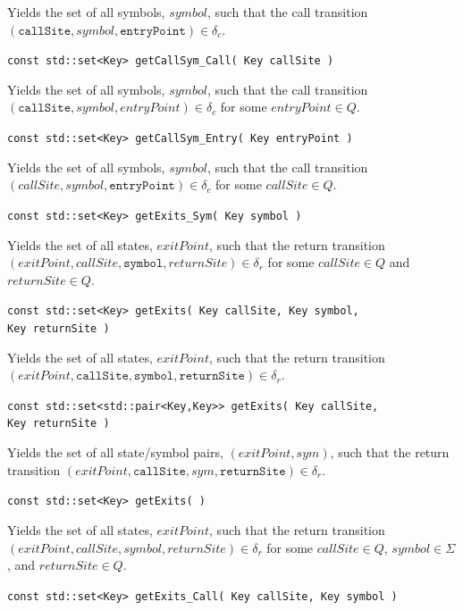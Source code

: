 \documentclass{llncs}
\begin{document}
\begin{description}
    Yields the set of all symbols, $symbol$, such that the call transition $(\texttt{callSite},symbol,\texttt{entryPoint}) \in \delta_c$.

  \item\texttt{const std::set<Key> getCallSym\_Call( Key callSite )}

    Yields the set of all symbols, $symbol$, such that the call transition $(\texttt{callSite},symbol,entryPoint) \in \delta_c$ for some $entryPoint \in Q$.

  \item\texttt{const std::set<Key> getCallSym\_Entry( Key entryPoint )}

    Yields the set of all symbols, $symbol$, such that the call transition $(callSite,symbol,\texttt{entryPoint}) \in \delta_c$ for some $callSite \in Q$.

  \item\texttt{const std::set<Key> getExits\_Sym( Key symbol )}

    Yields the set of all states, $exitPoint$, such that the return transition $(exitPoint,callSite,\texttt{symbol},returnSite) \in \delta_r$ for some $callSite \in Q$ and $returnSite \in Q$.

  \item\texttt{const std::set<Key> getExits( Key callSite, Key symbol,\\ \hspace*{3.25cm} Key returnSite )}

    Yields the set of all states, $exitPoint$, such that the return transition $(exitPoint,\texttt{callSite},\texttt{symbol},\texttt{returnSite}) \in \delta_r$.

  \item\texttt{const std::set<std::pair<Key,Key>> getExits( Key callSite,\\ \hspace*{3.25cm} Key returnSite )}

    Yields the set of all state/symbol pairs, $(exitPoint,sym)$, such that the return transition $(exitPoint,\texttt{callSite},sym,\texttt{returnSite}) \in \delta_r$.

  \item\texttt{const std::set<Key> getExits( )}

    Yields the set of all states, $exitPoint$, such that the return transition $(exitPoint,callSite,symbol,returnSite) \in \delta_r$ for some $callSite \in Q$, $symbol \in \Sigma$, and $returnSite \in Q$.

  \item\texttt{const std::set<Key> getExits\_Call( Key callSite, Key symbol )}


\end{description}
\end{document}
